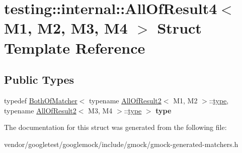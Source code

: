 \hypertarget{structtesting_1_1internal_1_1AllOfResult4}{}\section{testing\+:\+:internal\+:\+:All\+Of\+Result4$<$ M1, M2, M3, M4 $>$ Struct Template Reference}
\label{structtesting_1_1internal_1_1AllOfResult4}
\subsection*{Public Types}
\begin{DoxyCompactItemize}
\item 
typedef \hyperlink{classtesting_1_1internal_1_1BothOfMatcher}{Both\+Of\+Matcher}$<$ typename \hyperlink{structtesting_1_1internal_1_1AllOfResult2}{All\+Of\+Result2}$<$ M1, M2 $>$\+::\hyperlink{classtesting_1_1internal_1_1BothOfMatcher}{type}, typename \hyperlink{structtesting_1_1internal_1_1AllOfResult2}{All\+Of\+Result2}$<$ M3, M4 $>$\+::\hyperlink{classtesting_1_1internal_1_1BothOfMatcher}{type} $>$ {\bfseries type}\hypertarget{structtesting_1_1internal_1_1AllOfResult4_ab277e20178bac632d4e5a39a1a407bbf}{}\label{structtesting_1_1internal_1_1AllOfResult4_ab277e20178bac632d4e5a39a1a407bbf}

\end{DoxyCompactItemize}


The documentation for this struct was generated from the following file\+:\begin{DoxyCompactItemize}
\item 
vendor/googletest/googlemock/include/gmock/gmock-\/generated-\/matchers.\+h\end{DoxyCompactItemize}
